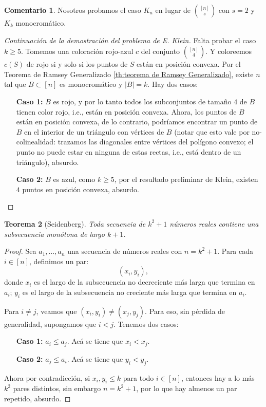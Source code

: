 \documentclass[12pt]{report}
\theoremstyle{plain}
\newtheorem{theorem}{Teorema}[section]
\theoremstyle{definition}
\newtheorem{remark}[theorem]{Comentario}
\newcommand{\abs}[1]{\left \vert #1 \right \vert}
\begin{document}
\begin{remark}
Nosotros probamos el caso $K_n$ en lugar de $\binom{[n]}{s}$ con $s = 2$ y $K_k$ monocromático.
\end{remark}

\begin{proof}[Continuación de la demostración del problema de E. Klein]
Falta probar el caso $k \geq 5$. Tomemos una coloración rojo-azul $c$ del conjunto $\binom{[n]}{4}$. Y coloreemos $c(S)$ de rojo si y solo si los puntos de $S$ están en posición convexa. Por el Teorema de Ramsey Generalizado \ref{th:teorema de Ramsey Generalizado}, existe $n$ tal que $B \subset [n]$ es monocromático y $\abs B = k$. Hay dos casos:
\begin{enumerate}
\item[\textbf{Caso 1:}] $B$ es rojo, y por lo tanto todos los subconjuntos de tamaño $4$ de $B$ tienen color rojo, i.e., están en posición convexa. Ahora, los puntos de $B$ están en posición convexa, de lo contrario, podríamos encontrar un punto de $B$ en el interior de un triángulo con vértices de $B$ (notar que esto vale por no-colinealidad: trazamos las diagonales entre vértices del polígono convexo; el punto no puede estar en ninguna de estas rectas, i.e., está dentro de un triángulo), absurdo.
\item[\textbf{Caso 2:}] $B$ es azul, como $k \geq 5$, por el resultado preliminar de Klein, existen $4$ puntos en posición convexa, absurdo.
\end{enumerate}
\end{proof}


\begin{theorem}[Seidenberg]
Toda secuencia de $k^2 + 1$ números reales contiene una subsecuencia monótona de largo $k+1$.
\end{theorem}
\begin{proof}
Sea $a_1, \ldots, a_n$ una secuencia de números reales con $n = k^2 + 1$. Para cada $i \in [n]$, definimos un par:
\[
    (x_i, y_i),
\]
donde $x_i$ es el largo de la subsecuencia no decreciente más larga que termina en $a_i$; $y_i$ es el largo de la subsecuencia no creciente más larga que termina en $a_i$.

Para $i \neq j$, veamos que $(x_i, y_i) \neq (x_j, y_j)$. Para eso, sin pérdida de generalidad, supongamos que $i < j$. Tenemos dos casos:
\begin{enumerate}
\item[\textbf{Caso 1:}] $a_i \leq a_j$. Acá se tiene que $x_i < x_j$.
\item[\textbf{Caso 2:}] $a_j \leq a_i$. Acá se tiene que $y_i < y_j$.
\end{enumerate}

Ahora por contradicción, si $x_i, y_i \leq k$ para todo $i \in [n]$, entonces hay a lo más $k^2$ pares distintos, sin embargo $n = k^2 + 1$, por lo que hay almenos un par repetido, absurdo.
\end{proof}
\end{document}
